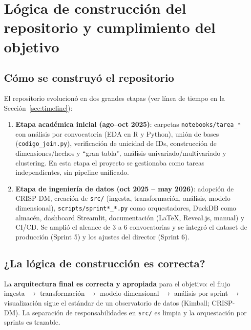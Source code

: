 
\section{Lógica de construcción del repositorio y cumplimiento del objetivo}

\subsection{Cómo se construyó el repositorio}

El repositorio evolucionó en dos grandes etapas (ver línea de tiempo en la
Sección~\ref{sec:timeline}):

\begin{enumerate}
  \item \textbf{Etapa académica inicial (ago--oct 2025)}: carpetas
        \texttt{notebooks/tarea\_*} con análisis por convocatoria (EDA en R y
        Python), unión de bases (\texttt{codigo\_join.py}), verificación de
        unicidad de IDs, construcción de dimensiones/hechos y ``gran tabla'',
        análisis univariado/multivariado y clustering. En esta etapa el proyecto
        se gestionaba como tareas independientes, sin pipeline unificado.
  \item \textbf{Etapa de ingeniería de datos (oct 2025 -- may 2026)}: adopción de
        CRISP-DM, creación de \texttt{src/} (ingesta, transformación, análisis,
        modelo dimensional), \texttt{scripts/sprint*\_*.py} como orquestadores,
        DuckDB como almacén, dashboard Streamlit, documentación (LaTeX,
        Reveal.js, manual) y CI/CD. Se amplió el alcance de 3 a 6 convocatorias y
        se integró el dataset de producción (Sprint 5) y los ajustes del director
        (Sprint 6).
\end{enumerate}

\subsection{¿La lógica de construcción es correcta?}

\begin{tcolorbox}[hallazgo]
La \textbf{arquitectura final es correcta y apropiada} para el objetivo: el
flujo ingesta $\rightarrow$ transformación $\rightarrow$ modelo dimensional
$\rightarrow$ análisis por sprint $\rightarrow$ visualización sigue el estándar
de un observatorio de datos (Kimball; CRISP-DM). La separación de responsabilidades
en \texttt{src/} es limpia y la orquestación por sprints es trazable.
\end{tcolorbox}

